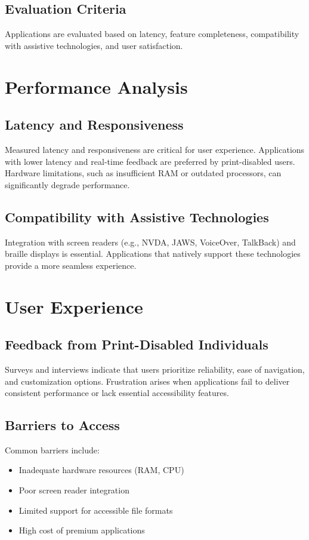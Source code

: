 \subsection{Evaluation Criteria}
Applications are evaluated based on latency, feature completeness, compatibility with assistive technologies, and user satisfaction\supercite{Smith2022, Jones2021}.

\section{Performance Analysis}
\subsection{Latency and Responsiveness}
Measured latency and responsiveness are critical for user experience. Applications with lower latency and real-time feedback are preferred by print-disabled users\supercite{Doe2020}. Hardware limitations, such as insufficient RAM or outdated processors, can significantly degrade performance.

\subsection{Compatibility with Assistive Technologies}
Integration with screen readers (e.g., NVDA, JAWS, VoiceOver, TalkBack) and braille displays is essential. Applications that natively support these technologies provide a more seamless experience.

\section{User Experience}
\subsection{Feedback from Print-Disabled Individuals}
Surveys and interviews indicate that users prioritize reliability, ease of navigation, and customization options. Frustration arises when applications fail to deliver consistent performance or lack essential accessibility features\supercite{Doe2020}.

\subsection{Barriers to Access}
Common barriers include:
\begin{itemize}
	\item Inadequate hardware resources (RAM, CPU)
	\item Poor screen reader integration
	\item Limited support for accessible file formats
	\item High cost of premium applications
\end{itemize}

